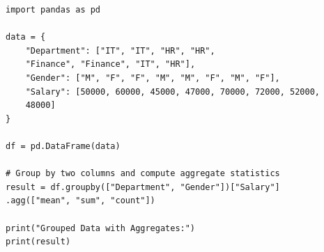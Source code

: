\begin{verbatim}
import pandas as pd

data = {
    "Department": ["IT", "IT", "HR", "HR", 
    "Finance", "Finance", "IT", "HR"],
    "Gender": ["M", "F", "F", "M", "M", "F", "M", "F"],
    "Salary": [50000, 60000, 45000, 47000, 70000, 72000, 52000, 
    48000]
}

df = pd.DataFrame(data)

# Group by two columns and compute aggregate statistics
result = df.groupby(["Department", "Gender"])["Salary"]
.agg(["mean", "sum", "count"])

print("Grouped Data with Aggregates:")
print(result)
\end{verbatim}